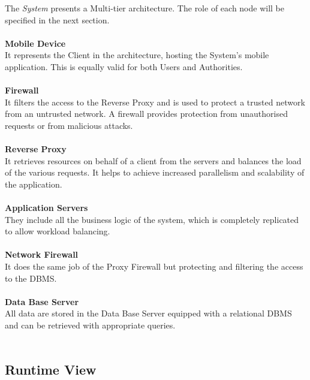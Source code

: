 \documentclass{article}
\begin{document}
	The {\it System} presents a Multi-tier architecture. The role of each node will be specified in the next section. \\ \\
			{\bf Mobile Device} \\
			It represents the Client in the architecture, hosting the System’s mobile application. This is equally valid for both Users and Authorities. \\ \\
			{\bf Firewall}\\
			It filters the access to the Reverse Proxy and is used to protect a trusted network from an untrusted network. A firewall provides protection from unauthorised requests or from malicious attacks. \\ \\
			{\bf Reverse Proxy}\\
			It retrieves resources on behalf of a client from the servers and balances the load of the various requests. It helps to achieve increased parallelism and scalability of the application. \\ \\
			{\bf Application Servers}\\
			They include all the business logic of the system, which is completely replicated to allow workload balancing. \\ \\
			{\bf Network Firewall}\\
			It does the same job of the Proxy Firewall but protecting and filtering the access to the DBMS. \\ \\
			{\bf Data Base Server}\\
			All data are stored in the Data Base Server equipped with a relational DBMS and can be retrieved with appropriate queries. \\ \\
	

	\subsection{Runtime View}
	
\end{document}
